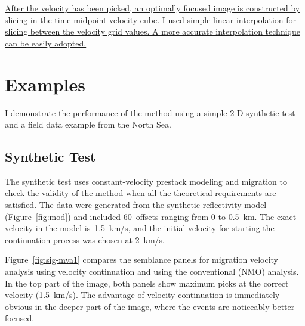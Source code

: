 \uline{After the velocity has been picked, an optimally focused image is constructed
by slicing in the time-midpoint-velocity cube. I used simple linear
interpolation for slicing between the velocity grid values. A more accurate
interpolation technique can be easily adopted.}

\section{Examples}

I demonstrate the performance of the method using a simple 2-D synthetic
test and a field data example from the North Sea.

\subsection{Synthetic Test}

The synthetic test uses constant-velocity prestack modeling and migration to
check the validity of the method when all the theoretical requirements are
satisfied. The data were generated from the synthetic reflectivity model
(Figure~\ref{fig:mod}) and included 60~offsets ranging from 0 to 0.5~km.
The exact velocity in the model is~1.5~km/s, and the initial velocity for
starting the continuation process was chosen at 2~km/s.


Figure~\ref{fig:sig-mva1} compares the semblance panels for migration
velocity analysis using velocity continuation and using the
conventional (NMO) analysis. In the top part of the image, both panels
show maximum picks at the correct velocity (1.5~km/s).  The advantage
of velocity continuation is immediately obvious in the deeper part of
the image, where the events are noticeably better focused.


